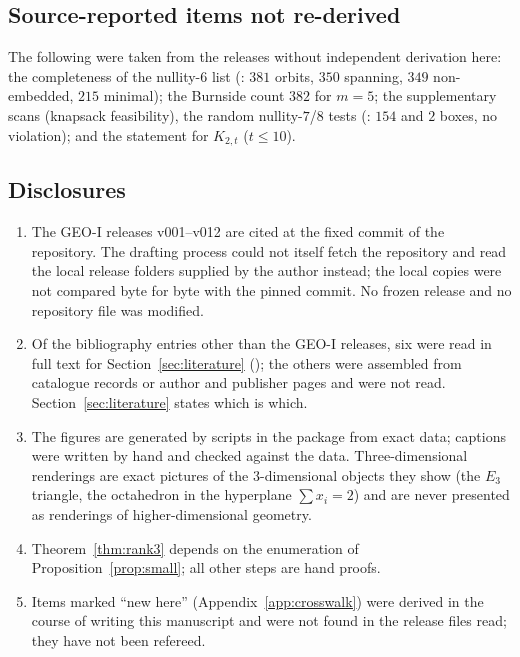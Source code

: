 \subsection{Source-reported items not re-derived}

The following were taken from the releases without independent derivation here: the completeness of the nullity-$6$ list (: $381$ orbits, $350$ spanning, $349$ non-embedded, $215$ minimal); the Burnside count $382$ for $m=5$; the supplementary scans  (knapsack feasibility), the random nullity-$7$/$8$ tests (: $154$ and $2$ boxes, no violation); and the statement  for $K_{2,t}$ ($t\le10$).

\subsection{Disclosures}

\begin{enumerate}
\item The GEO-I releases v001--v012 are cited at the fixed commit \geoicommit{} of the repository. The drafting process could not itself fetch the repository and read the local release folders supplied by the author instead; the local copies were not compared byte for byte with the pinned commit. No frozen release and no repository file was modified.
\item Of the bibliography entries other than the GEO-I releases, six were read in full text for Section~\ref{sec:literature} (\cite{Heden2012,KurzTail,KurzGF28,CooperOkur,MSS,Kim2009}); the others were assembled from catalogue records or author and publisher pages and were not read. Section~\ref{sec:literature} states which is which.
\item The figures are generated by scripts in the package from exact data; captions were written by hand and checked against the data. Three-dimensional renderings are exact pictures of the $3$-dimensional objects they show (the $E_3$ triangle, the octahedron in the hyperplane $\sum x_i=2$) and are never presented as renderings of higher-dimensional geometry.
\item Theorem~\ref{thm:rank3} depends on the enumeration of Proposition~\ref{prop:small}; all other steps are hand proofs.
\item Items marked ``new here'' (Appendix~\ref{app:crosswalk}) were derived in the course of writing this manuscript and were not found in the release files read; they have not been refereed.
\end{enumerate}

